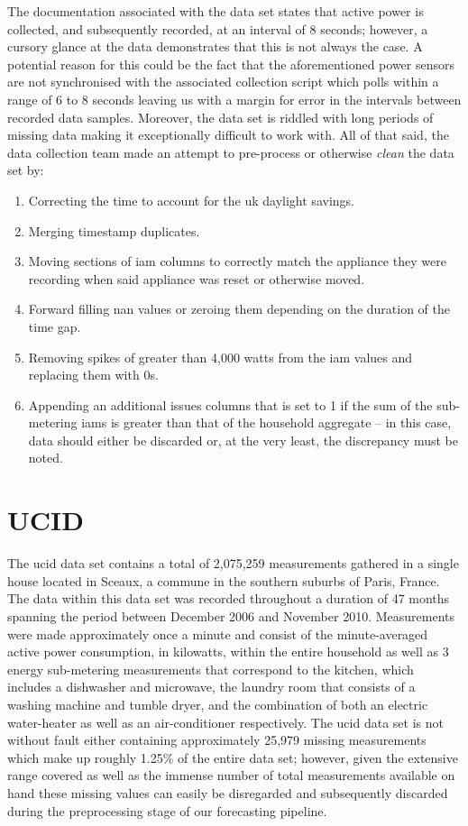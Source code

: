 \noindent \newline The documentation associated with the data set states that active power is collected, and subsequently recorded, at an interval of 8 seconds; however, a cursory glance at the data demonstrates that this is not always the case. A potential reason for this could be the fact that the aforementioned power sensors are not synchronised with the associated collection script which polls within a range of 6 to 8 seconds leaving us with a margin for error in the intervals between recorded data samples. Moreover, the data set is riddled with long periods of missing data making it exceptionally difficult to work with. All of that said, the data collection team made an attempt to pre-process or otherwise \textit{clean} the data set by:

\begin{enumerate}
    \item Correcting the time to account for the \gls{uk} daylight savings.
    \item Merging timestamp duplicates.
    \item Moving sections of \gls{iam} columns to correctly match the appliance they were recording when said appliance was reset or otherwise moved.
    \item Forward filling \gls{nan} values or zeroing them depending on the duration of the time gap.
    \item Removing spikes of greater than 4,000 watts from the \gls{iam} values and replacing them with 0s.
    \item Appending an additional issues columns that is set to 1 if the sum of the sub-metering \glspl{iam} is greater than that of the household aggregate -- in this case, data should either be discarded or, at the very least, the discrepancy must be noted.
\end{enumerate}

\section{UCID}
\label{sec:Data-Description:UCID}
The \gls{ucid} data set contains a total of 2,075,259 measurements gathered in a single house located in Sceaux, a commune in the southern suburbs of Paris, France. The data within this data set was recorded throughout a duration of 47 months spanning the period between December 2006 and November 2010. Measurements were made approximately once a minute and consist of the minute-averaged active power consumption, in kilowatts, within the entire household as well as 3 energy sub-metering measurements that correspond to the kitchen, which includes a dishwasher and microwave, the laundry room that consists of a washing machine and tumble dryer, and the combination of both an electric water-heater as well as an air-conditioner respectively. The \gls{ucid} data set is not without fault either containing approximately 25,979 missing measurements which make up roughly 1.25\% of the entire data set; however, given the extensive range covered as well as the immense number of total measurements available on hand these missing values can easily be disregarded and subsequently discarded during the preprocessing stage of our forecasting pipeline.


